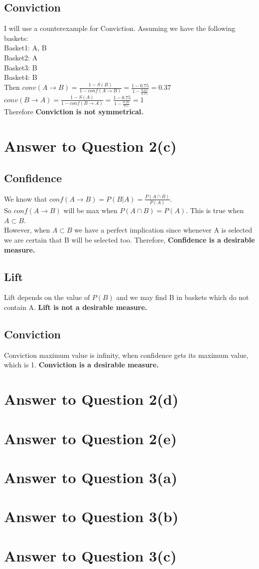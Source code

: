 \documentclass[11pt]{article}
\begin{document}
\subsection*{Conviction}
I will use a counterexample for Conviction. Assuming we have the following baskets:\\
Basket1: A, B \\
Basket2: A\\
Basket3: B\\
Basket4: B\\
Then $ conv(A \rightarrow B) = \frac{1-S(B)}{1 - conf(A \rightarrow B)} = \frac{1 - 0.75}{1 - \frac{0.25}{0.75}} = 0.37$ \\
$ conv(B \rightarrow A) = \frac{1-S(A)}{1 - conf(B \rightarrow A)} = \frac{1 - 0.75}{1 - \frac{0.25}{0.5}} = 1$\\
 Therefore \textbf{Conviction is not symmetrical.}
\pagebreak[4]
\section*{Answer to Question 2(c)}
\subsection*{Confidence}
We know that
$conf( A \rightarrow B) = P(B|A) = \frac{P(A\cap B)}{P(A)}$. \\
So  $conf( A \rightarrow B)$ will be max when $P(A\cap B) = P(A)$. This is true when $A\subset B$.\\
However, when $A\subset B$ we have a perfect implication since whenever A is selected we are certain that B will be selected too. Therefore, \textbf{Confidence is a desirable measure.}
\subsection*{Lift}
Lift depends on the value of $P(B)$ and we may find B in baskets which do not contain A. \textbf{Lift is not a desirable measure.}
\subsection*{Conviction}
Conviction maximum value is infinity, when confidence gets its maximum value, which is 1. \textbf{Conviction is a desirable measure.}
\pagebreak[4]
\section*{Answer to Question 2(d)}

\pagebreak[4]
\section*{Answer to Question 2(e)}

\pagebreak[4]
\section*{Answer to Question 3(a)}

\pagebreak[4]
\section*{Answer to Question 3(b)}

\pagebreak[4]
\section*{Answer to Question 3(c)}
\end{document}
